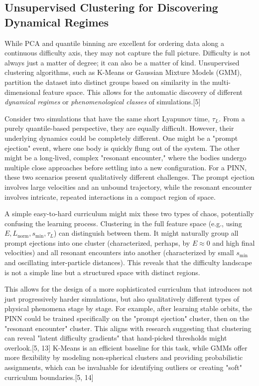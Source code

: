 \subsection{Unsupervised Clustering for Discovering Dynamical Regimes}

While PCA and quantile binning are excellent for ordering data along a continuous difficulty axis, they may not capture the full picture. Difficulty is not always just a matter of degree; it can also be a matter of kind. Unsupervised clustering algorithms, such as K-Means or Gaussian Mixture Models (GMM), partition the dataset into distinct groups based on similarity in the multi-dimensional feature space. This allows for the automatic discovery of different \textit{dynamical regimes} or \textit{phenomenological classes} of simulations.[5]

Consider two simulations that have the same short Lyapunov time, $\tau_L$. From a purely quantile-based perspective, they are equally difficult. However, their underlying dynamics could be completely different. One might be a "prompt ejection" event, where one body is quickly flung out of the system. The other might be a long-lived, complex "resonant encounter," where the bodies undergo multiple close approaches before settling into a new configuration. For a PINN, these two scenarios present qualitatively different challenges. The prompt ejection involves large velocities and an unbound trajectory, while the resonant encounter involves intricate, repeated interactions in a compact region of space.

A simple easy-to-hard curriculum might mix these two types of chaos, potentially confusing the learning process. Clustering in the full feature space (e.g., using $E, L_{\text{norm}}, s_{\text{min}}, \tau_L$) can distinguish between them. It might naturally group all prompt ejections into one cluster (characterized, perhaps, by $E \approx 0$ and high final velocities) and all resonant encounters into another (characterized by small $s_{\text{min}}$ and oscillating inter-particle distances). This reveals that the difficulty landscape is not a simple line but a structured space with distinct regions.

This allows for the design of a more sophisticated curriculum that introduces not just progressively harder simulations, but also qualitatively different types of physical phenomena stage by stage. For example, after learning stable orbits, the PINN could be trained specifically on the "prompt ejection" cluster, then on the "resonant encounter" cluster. This aligns with research suggesting that clustering can reveal "latent difficulty gradients" that hand-picked thresholds might overlook.[5, 13] K-Means is an efficient baseline for this task, while GMMs offer more flexibility by modeling non-spherical clusters and providing probabilistic assignments, which can be invaluable for identifying outliers or creating "soft" curriculum boundaries.[5, 14]

